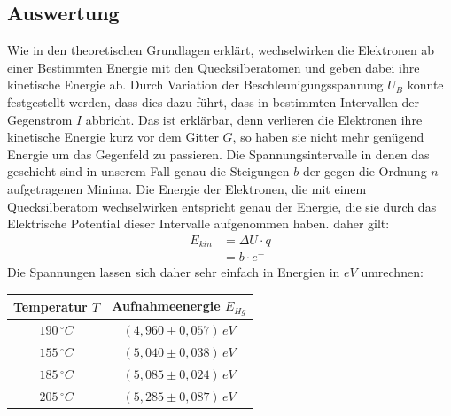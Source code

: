\subsection{Auswertung}
Wie in den theoretischen Grundlagen erklärt, wechselwirken die Elektronen ab einer Bestimmten Energie mit den Quecksilberatomen und geben dabei ihre kinetische Energie ab. Durch Variation der Beschleunigungsspannung \(U_B\) konnte festgestellt werden, dass dies dazu führt, dass in bestimmten Intervallen der Gegenstrom \(I\) abbricht. Das ist erklärbar, denn verlieren die Elektronen ihre kinetische Energie kurz vor dem Gitter \(G\), so haben sie nicht mehr genügend Energie um das Gegenfeld zu passieren. Die Spannungsintervalle in denen das geschieht sind in unserem Fall genau die Steigungen \(b\) der gegen die Ordnung \(n\) aufgetragenen Minima. Die Energie der Elektronen, die mit einem Quecksilberatom wechselwirken entspricht genau der Energie, die sie durch das Elektrische Potential dieser Intervalle aufgenommen haben. daher gilt:
\begin{align}
E_{kin} &= \Delta U \cdot q \\
&= b \cdot e^- 
\end{align}
Die Spannungen lassen sich daher sehr einfach in Energien in \(eV\) umrechnen:
\begin{center}
\begin{tabular}{c|c}
Temperatur \(T\) & Aufnahmeenergie \(E_{Hg}\)\\\hline
\(190\, ^\circ C\) & \(\left( 4,960 \pm 0,057 \right) \, eV\) \\
\(155\, ^\circ C\) & \(\left( 5,040 \pm 0,038 \right) \, eV\) \\
\(185\, ^\circ C\) & \(\left( 5,085 \pm 0,024 \right) \, eV\) \\
\(205\, ^\circ C\) & \(\left( 5,285 \pm 0,087 \right) \, eV\) \\
\end{tabular}
\end{center}
